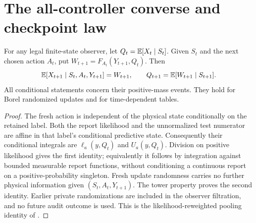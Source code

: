 \section{The all-controller converse and checkpoint law}\label{sec:converse}
\begin{lemma}\label{lem:barycenter}
For any legal finite-state observer, let $Q_t=\mathbb E[X_t\mid S_t]$. Given $S_t$ and the next chosen action $A_t$, put $W_{t+1}=F_{A_t}(Y_{t+1},Q_t)$. Then
\[
 \mathbb E[X_{t+1}\mid S_t,A_t,Y_{t+1}]=W_{t+1},\qquad
 Q_{t+1}=\mathbb E[W_{t+1}\mid S_{t+1}].
\]
All conditional statements concern their positive-mass events. They hold for Borel randomized updates and for time-dependent tables.
\end{lemma}
\begin{proof}
The fresh action is independent of the physical state conditionally on the retained label. Both the report likelihood and the unnormalized test numerator are affine in that label's conditional predictive state. Consequently their conditional integrals are $\ell_a(y,Q_t)$ and $U_a(y,Q_t)$. Division on positive likelihood gives the first identity; equivalently it follows by integration against bounded measurable report functions, without conditioning a continuous report on a positive-probability singleton. Fresh update randomness carries no further physical information given $(S_t,A_t,Y_{t+1})$. The tower property proves the second identity. Earlier private randomizations are included in the observer filtration, and no future audit outcome is used. This is the likelihood-reweighted pooling identity of \cite{GTFBayes,GTFControlled}.
\end{proof}

